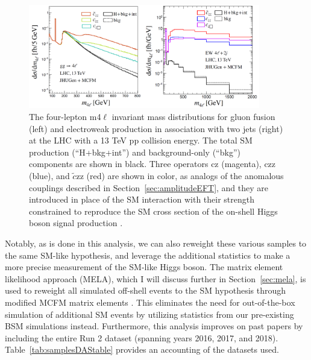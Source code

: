 \begin{figure}[!hbt]
\centering
\includegraphics[width=0.9\textwidth,clip] {figures/offshellAC_BSI.png}
\caption{ The four-lepton m4$\ell$ invariant mass distributions for gluon fusion (left) and electroweak production in association with two jets (right) at the LHC with a 13 TeV pp collision energy. The total SM production (“H+bkg+int”) and background-only (“bkg”) components are shown in black. Three operators cz (magenta), czz (blue), and $\tilde{c}$zz (red) are shown in color, as analogs of the anomalous couplings described in Section~\ref{sec:amplitudeEFT}, and they are introduced in place of the SM interaction with their strength constrained to reproduce the SM cross section of the on-shell Higgs boson signal production \cite{offshellWGnote}.}
\label{fig:offshellAC_BSI}
\end{figure}

Notably, as is done in this analysis, we can also reweight these various samples to the same SM-like hypothesis, and leverage the additional statistics to make a more precise measurement of the SM-like Higgs boson. The matrix element likelihood approach (MELA), which I will discuss further in Section~\ref{sec:mela}, is used to reweight all simulated off-shell events to the SM hypothesis through modified MCFM matrix elements \cite{12077235,10073492}. This eliminates the need for out-of-the-box simulation of additional SM events by utilizing statistics from our pre-existing BSM simulations instead. Furthermore, this analysis improves on past papers \cite{190100174} by including the entire Run 2 dataset (spanning years 2016, 2017, and 2018). Table~\ref{tab:samplesDAStable} provides an accounting of the datasets used.

